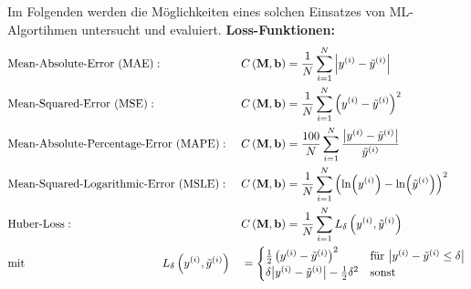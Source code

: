 Im Folgenden werden die Möglichkeiten eines solchen Einsatzes von ML-Algortihmen untersucht und evaluiert.
\textbf{Loss-Funktionen:}
\begin{equation}
\begin{aligned}
&\text{Mean-Absolute-Error (MAE)}: \quad &&C\left(\mathbf{M}, \mathbf{b}\right) = \frac{1}{N} \sum_{i=1}^{N} \abs{y^{(i)} - \tilde{y}^{(i)}} \\
&\text{Mean-Squared-Error (MSE)}: \quad &&C\left(\mathbf{M}, \mathbf{b}\right) = \frac{1}{N} \sum_{i=1}^{N} \left(y^{(i)} - \tilde{y}^{(i)}\right)^2 \\
&\text{Mean-Absolute-Percentage-Error (MAPE)}: &&C\left(\mathbf{M}, \mathbf{b}\right) = \frac{100}{N} \sum_{i=1}^{N} \frac{\abs{y^{(i)} - \tilde{y}^{(i)}}  }{\tilde{y}^{(i)}}\\
&\text{Mean-Squared-Logarithmic-Error (MSLE)}: &&C\left(\mathbf{M}, \mathbf{b}\right) = \frac{1}{N} \sum_{i=1}^{N} \left(\ln(y^{(i)}) - \ln(\tilde{y}^{(i)})\right)^2 \\
&\text{Huber-Loss}: &&C\left(\mathbf{M}, \mathbf{b}\right) = \frac{1}{N} \sum_{i=1}^{N} L_{\delta}\left(y^{(i)}, \tilde{y}^{(i)}\right)\\
&\text{mit}\qquad \qquad \qquad \qquad \qquad \qquad L_{\delta}\left(y^{(i)}, \tilde{y}^{(i)}\right)&&=\begin{cases}
\frac{1}{2}\left(y^{(i)} -  \tilde{y}^{(i)}\right)^2 \quad &\text{für}~\abs{y^{(i)} -  \tilde{y}^{(i)} \leq \delta} \\
\delta \abs{y^{(i)} -  \tilde{y}^{(i)}} - \frac{1}{2}\delta^2 &\text{sonst}
\end{cases}
\end{aligned}
\label{Loss-Funktionen}
\end{equation}

